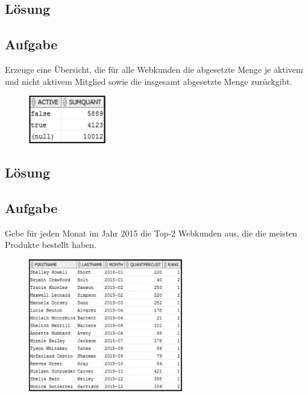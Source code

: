 \subsection*{Lösung}
\label{subsec:uebung_10.aufgabe_02.loesung}


\label{subsec:uebung_10.aufgabe_03}
\subsection{Aufgabe}
Erzeuge eine Übersicht, die für alle Webkunden die abgesetzte Menge je aktivem und nicht aktivem Mitglied sowie die insgesamt abgesetzte Menge zurückgibt.

\begin{figure}[H]
  \centering
  \includegraphics[width=0.3\textwidth]{img//uebung_10_-_aufgabe_03.png}
  \label{img:uebung_10_-_aufgabe_03}
\end{figure}

\subsection*{Lösung}
\label{subsec:uebung_10.aufgabe_03.loesung}


\label{subsec:uebung_10.aufgabe_04}
\subsection{Aufgabe}
Gebe für jeden Monat im Jahr 2015 die Top-2 Webkunden aus, die die meisten Produkte bestellt haben.

\begin{figure}[H]
  \centering
  \includegraphics[width=0.6\textwidth]{img//uebung_10_-_aufgabe_04.png}
  \label{img:uebung_10_-_aufgabe_04}
\end{figure}

